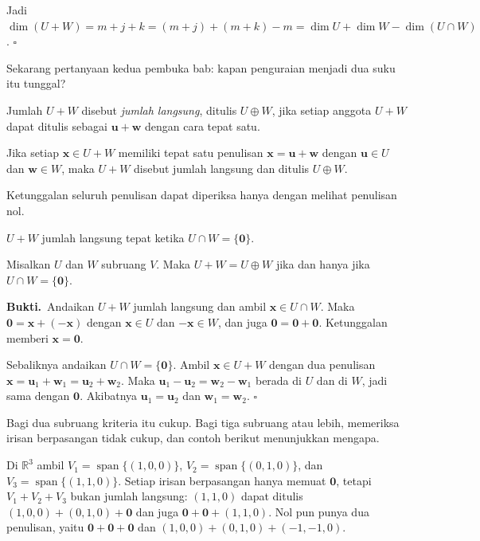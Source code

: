 Jadi $\dim(U+W)=m+j+k=(m+j)+(m+k)-m=\dim U+\dim W-\dim(U\cap W)$.
\hfill$\square$\par\medskip

Sekarang pertanyaan kedua pembuka bab: kapan penguraian menjadi dua suku itu tunggal?

Jumlah $U+W$ disebut \emph{jumlah langsung}, ditulis $U\oplus W$, jika setiap anggota
$U+W$ dapat ditulis sebagai $\mathbf{u}+\mathbf{w}$ dengan cara tepat satu.

\begin{definisi}
Jika setiap $\mathbf{x}\in U+W$ memiliki tepat satu penulisan
$\mathbf{x}=\mathbf{u}+\mathbf{w}$ dengan $\mathbf{u}\in U$ dan $\mathbf{w}\in W$, maka
$U+W$ disebut jumlah langsung dan ditulis $U\oplus W$.
\end{definisi}

Ketunggalan seluruh penulisan dapat diperiksa hanya dengan melihat penulisan nol.

$U+W$ jumlah langsung tepat ketika $U\cap W=\{\mathbf{0}\}$.

\begin{teorema}
Misalkan $U$ dan $W$ subruang $V$. Maka $U+W=U\oplus W$ jika dan hanya jika
$U\cap W=\{\mathbf{0}\}$.
\end{teorema}

\par\medskip\noindent\textbf{Bukti.}\ 
Andaikan $U+W$ jumlah langsung dan ambil $\mathbf{x}\in U\cap W$. Maka
$\mathbf{0}=\mathbf{x}+(-\mathbf{x})$ dengan $\mathbf{x}\in U$ dan $-\mathbf{x}\in W$, dan
juga $\mathbf{0}=\mathbf{0}+\mathbf{0}$. Ketunggalan memberi $\mathbf{x}=\mathbf{0}$.

Sebaliknya andaikan $U\cap W=\{\mathbf{0}\}$. Ambil $\mathbf{x}\in U+W$ dengan dua penulisan
$\mathbf{x}=\mathbf{u}_{1}+\mathbf{w}_{1}=\mathbf{u}_{2}+\mathbf{w}_{2}$. Maka
$\mathbf{u}_{1}-\mathbf{u}_{2}=\mathbf{w}_{2}-\mathbf{w}_{1}$ berada di $U$ dan di $W$,
jadi sama dengan $\mathbf{0}$. Akibatnya $\mathbf{u}_{1}=\mathbf{u}_{2}$ dan
$\mathbf{w}_{1}=\mathbf{w}_{2}$.
\hfill$\square$\par\medskip

Bagi dua subruang kriteria itu cukup. Bagi tiga subruang atau lebih, memeriksa irisan
berpasangan tidak cukup, dan contoh berikut menunjukkan mengapa.

Di $\mathbb{R}^{3}$ ambil $V_{1}=\operatorname{span}\{(1,0,0)\}$,
$V_{2}=\operatorname{span}\{(0,1,0)\}$, dan $V_{3}=\operatorname{span}\{(1,1,0)\}$. Setiap
irisan berpasangan hanya memuat $\mathbf{0}$, tetapi $V_{1}+V_{2}+V_{3}$ bukan jumlah
langsung: $(1,1,0)$ dapat ditulis $(1,0,0)+(0,1,0)+\mathbf{0}$ dan juga
$\mathbf{0}+\mathbf{0}+(1,1,0)$. Nol pun punya dua penulisan, yaitu
$\mathbf{0}+\mathbf{0}+\mathbf{0}$ dan $(1,0,0)+(0,1,0)+(-1,-1,0)$.

